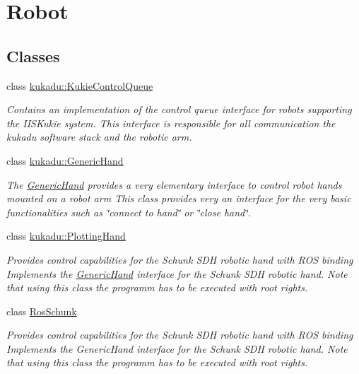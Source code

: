 \hypertarget{group__Robot}{}\section{Robot}
\label{group__Robot}
\subsection*{Classes}
\begin{DoxyCompactItemize}
\item 
class \hyperlink{classkukadu_1_1KukieControlQueue}{kukadu\+::\+Kukie\+Control\+Queue}
\begin{DoxyCompactList}\small\item\em Contains an implementation of the control queue interface for robots supporting the I\+I\+S\+Kukie system. This interface is responsible for all communication the kukadu software stack and the robotic arm. \end{DoxyCompactList}\item 
class \hyperlink{classkukadu_1_1GenericHand}{kukadu\+::\+Generic\+Hand}
\begin{DoxyCompactList}\small\item\em The \hyperlink{classkukadu_1_1GenericHand}{Generic\+Hand} provides a very elementary interface to control robot hands mounted on a robot arm This class provides very an interface for the very basic functionalities such as \char`\"{}connect to hand\char`\"{} or \char`\"{}close hand\char`\"{}. \end{DoxyCompactList}\item 
class \hyperlink{classkukadu_1_1PlottingHand}{kukadu\+::\+Plotting\+Hand}
\begin{DoxyCompactList}\small\item\em Provides control capabilities for the Schunk S\+DH robotic hand with R\+OS binding Implements the \hyperlink{classkukadu_1_1GenericHand}{Generic\+Hand} interface for the Schunk S\+DH robotic hand. Note that using this class the programm has to be executed with root rights. \end{DoxyCompactList}\item 
class \hyperlink{classRosSchunk}{Ros\+Schunk}
\begin{DoxyCompactList}\small\item\em Provides control capabilities for the Schunk S\+DH robotic hand with R\+OS binding Implements the Generic\+Hand interface for the Schunk S\+DH robotic hand. Note that using this class the programm has to be executed with root rights. \end{DoxyCompactList}\item 

\end{DoxyCompactItemize}
